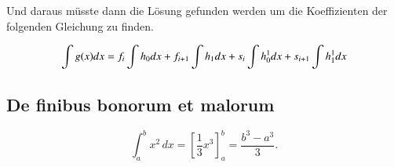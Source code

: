 Und daraus müsste dann die Lösung gefunden werden um die Koeffizienten der folgenden Gleichung zu finden.

\begin{equation}
\int g(x) \space dx = f_i \int h_0 \space dx+ f_{i+1}\int h_1 \space dx + s_i\int h_0^1 dx + s_{i+1}\int h_1^1 dx
\label{fem:equation5}
\end{equation}


\subsection{De finibus bonorum et malorum
\label{fem:subsection:finibus}}

\begin{equation}
\int_a^b x^2\, dx
=
\left[ \frac13 x^3 \right]_a^b
=
\frac{b^3-a^3}3.
\label{fem:equation1}
\end{equation}



